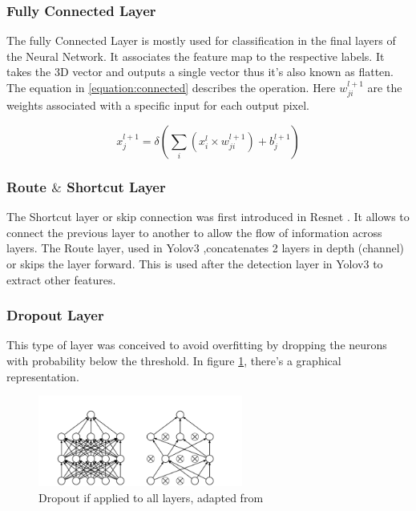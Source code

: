 \subsubsection{Fully Connected Layer}

The fully Connected Layer is mostly used for classification in the final layers of the Neural Network. It associates the feature map to the respective labels.
It takes the 3D vector and outputs a single vector thus it's also known as flatten.
 The equation in \ref{equation:connected} describes the operation. Here $w_{ji}^{l+1}$ are the weights
 associated with a specific input for each output pixel.



\begin{equation} \label{equation:connected}
     \displaystyle x_{j}^{l+1}=\delta (\sum_{i}(x_{i}^{l} \times w_{ji}^{l+1})+ b_{j}^{l+1})
 \end{equation}
 


\subsubsection{Route $\&$ Shortcut Layer}

The Shortcut layer or skip connection was first introduced in Resnet \cite{resnet}.
It allows to connect the previous layer to another to allow the flow of information across layers.
The Route layer, used in Yolov3 \cite{yolov3}
,concatenates 2 layers in depth (channel) or skips the layer forward. This is used after the detection layer in Yolov3 to extract other features.

\subsubsection{Dropout Layer}

This type of layer was conceived to avoid overfitting \cite{Dropout}
by dropping the neurons with probability below the threshold. In figure \ref{figure:Dropout}, there's a
graphical representation.
\begin{figure}[!htbp]
    \centering
    \includegraphics[width=0.6\textwidth]{Figures/Dropout.png}
    \caption{Dropout if applied to all layers, adapted from~\cite{Dropout}}
    \label{figure:Dropout}
\end{figure} 

